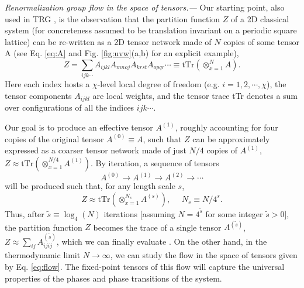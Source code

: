 \documentclass[aps,prl,twocolumn,showpacs,superscriptaddress,floatfix,10pt]{revtex4-1}
\newcommand{\tTr}[1]{\mbox{$\text{tTr}\left( #1 \right)$}}
\begin{document}
\textit{Renormalization group flow in the space of tensors.---} Our starting point, also used in TRG \cite{TRG,TRGenv,SRG,TEFR,TRGplus,HOTRG,TRG3D}, is the observation that the partition function $Z$ of a 2D classical system (for concreteness assumed to be translation invariant on a periodic square lattice) can be re-written as a 2D tensor network made of $N$ copies of some tensor A (see Eq. \ref{eq:A} and Fig. \ref{fig:uvw}(a,b) for an explicit example), 
\begin{equation} \label{eq:Z}
Z = \sum_{ijk\cdots} A_{ijkl}  A_{mnoj}  A_{krst}  A_{opqr} \cdots \equiv \tTr{\otimes_{x=1}^{N} A}.
\end{equation} 
Here each index hosts a $\chi$-level local degree of freedom (e.g. $i=1,2,\cdots, \chi$), the tensor components $A_{ijkl}$ are local weights, and the tensor trace tTr denotes a sum over configurations of all the indices $ijk\cdots$. 

Our goal is to produce an effective tensor $A^{(1)}$, roughly accounting for four copies of the original tensor $A^{(0)} \equiv A$, such that $Z$ can be approximately expressed as a coarser tensor network made of just $N/4$ copies of $A^{(1)}$, $Z \approx \tTr{\otimes_{x=1}^{N/4} A^{(1)}}$. By iteration, a sequence of tensors 
\begin{equation} \label{eq:flow}
A^{(0)} \rightarrow A^{(1)} \rightarrow  A^{(2)} \rightarrow \cdots
\end{equation}
will be produced such that, for any length scale $s$,
\begin{equation}
Z \approx \tTr{\otimes_{x=1}^{N_s} A^{(s)}},~~~~~~N_s \equiv N/4^s.
\end{equation}
Thus, after $\tilde{s} \equiv \log_4 (N)$ iterations [assuming $N = 4^{\tilde{s}}$ for some integer $\tilde{s}>0$], the partition function $Z$ becomes the trace of a single tensor $A^{ ( \tilde{s} )}$, $Z \approx \sum_{ij} A^{(\tilde{s})}_{ijij}$, which we can finally evaluate \cite{npoint}. On the other hand, in the thermodynamic limit $N\rightarrow \infty$, we can study the flow in the space of tensors given by Eq. \ref{eq:flow}. The fixed-point tensors of this flow will capture the universal properties of the phases and phase transitions of the system.
\end{document}
